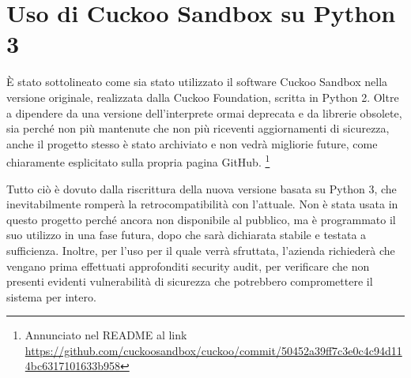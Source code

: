\section{Uso di Cuckoo Sandbox su Python 3}
È stato sottolineato come sia stato utilizzato il software Cuckoo Sandbox nella versione originale, realizzata dalla Cuckoo Foundation, scritta in Python 2. Oltre a dipendere da una versione dell'interprete ormai deprecata e da librerie obsolete, sia perché non più mantenute che non più riceventi aggiornamenti di sicurezza, anche il progetto stesso è stato archiviato e non vedrà migliorie future, come chiaramente esplicitato sulla propria pagina GitHub.
\footnote{Annunciato nel README al link \url{https://github.com/cuckoosandbox/cuckoo/commit/50452a39ff7c3e0c4c94d114bc6317101633b958}}

Tutto ciò è dovuto dalla riscrittura della nuova versione basata su Python 3, che inevitabilmente romperà la retrocompatibilità con l'attuale.
Non è stata usata in questo progetto perché ancora non disponibile al pubblico, ma è programmato il suo utilizzo in una fase futura, dopo che sarà dichiarata stabile e testata a sufficienza. Inoltre, per l'uso per il quale verrà sfruttata, l'azienda richiederà che vengano prima effettuati approfonditi security audit, per verificare che non presenti evidenti vulnerabilità di sicurezza che potrebbero compromettere il sistema per intero.
